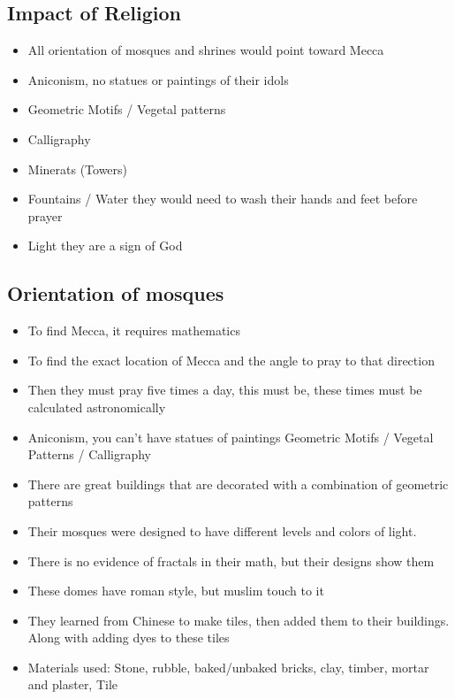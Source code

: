 \documentclass{article}
\begin{document}
\subsection{Impact of Religion}
\begin{itemize}
  \item All orientation of mosques and shrines would point toward Mecca
  \item Aniconism, no statues or paintings of their idols
  \item Geometric Motifs / Vegetal patterns
  \item Calligraphy
  \item Minerats (Towers)
  \item Fountains / Water \rightarrow{} they would need to wash their hands and
    feet before prayer
  \item Light \rightarrow{} they are a sign of God
\end{itemize}

\subsection{Orientation of mosques}
\begin{itemize}
  \item To find Mecca, it requires mathematics
  \item To find the exact location of Mecca and the angle
    to pray to that direction
  \item Then they must pray five times a day,
    this must be, these times must be calculated astronomically
  \item Aniconism, you can't have statues of paintings
    \rightarrow{} Geometric Motifs / Vegetal Patterns / Calligraphy
  \item There are great buildings that are decorated with a combination of geometric
    patterns

  \item Their mosques were designed to have different levels and colors of light.
  \item There is no evidence of fractals in their math, but their designs show them
  \item These domes have roman style, but muslim touch to it
  \item They learned from Chinese to make tiles, then added them to their
    buildings. Along with adding dyes to these tiles
  \item Materials used: Stone, rubble, baked/unbaked bricks,
    clay, timber, mortar and plaster, Tile
\end{itemize}
\end{document}
